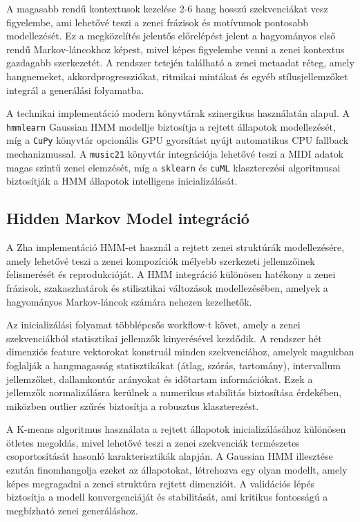 A magasabb rendű kontextusok kezelése 2-6 hang hosszú szekvenciákat vesz figyelembe, ami lehetővé teszi a zenei frázisok és motívumok pontosabb modellezését. Ez a megközelítés jelentős előrelépést jelent a hagyományos első rendű Markov-láncokhoz képest, mivel képes figyelembe venni a zenei kontextus gazdagabb szerkezetét. A rendszer tetején található a zenei metaadat réteg, amely hangnemeket, akkordprogressziókat, ritmikai mintákat és egyéb stílusjellemzőket integrál a generálási folyamatba.

A technikai implementáció modern könyvtárak szinergikus használatán alapul. A \texttt{hmmlearn} Gaussian HMM modellje biztosítja a rejtett állapotok modellezését, míg a \texttt{CuPy} könyvtár opcionális GPU gyorsítást nyújt automatikus CPU fallback mechanizmussal. A \texttt{music21} könyvtár integrációja lehetővé teszi a MIDI adatok magas szintű zenei elemzését, míg a \texttt{sklearn} és \texttt{cuML} klaszterezési algoritmusai biztosítják a HMM állapotok intelligens inicializálását.

\subsection{Hidden Markov Model integráció}

A Zha implementáció HMM-et használ a rejtett zenei struktúrák modellezésére, amely lehetővé teszi a zenei kompozíciók mélyebb szerkezeti jellemzőinek felismerését és reprodukcióját. A HMM integráció különösen hatékony a zenei frázisok, szakaszhatárok és stilisztikai változások modellezésében, amelyek a hagyományos Markov-láncok számára nehezen kezelhetők.

Az inicializálási folyamat többlépcsős workflow-t követ, amely a zenei szekvenciákból statisztikai jellemzők kinyerésével kezdődik. A rendszer hét dimenziós feature vektorokat konstruál minden szekvenciához, amelyek magukban foglalják a hangmagasság statisztikákat (átlag, szórás, tartomány), intervallum jellemzőket, dallamkontúr arányokat és időtartam információkat. Ezek a jellemzők normalizálásra kerülnek a numerikus stabilitás biztosítása érdekében, miközben outlier szűrés biztosítja a robusztus klaszterezést.

A K-means algoritmus használata a rejtett állapotok inicializálásához különösen ötletes megoldás, mivel lehetővé teszi a zenei szekvenciák természetes csoportosítását hasonló karakterisztikák alapján. A Gaussian HMM illesztése ezután finomhangolja ezeket az állapotokat, létrehozva egy olyan modellt, amely képes megragadni a zenei struktúra rejtett dimenzióit. A validációs lépés biztosítja a modell konvergenciáját és stabilitását, ami kritikus fontosságú a megbízható zenei generáláshoz.

